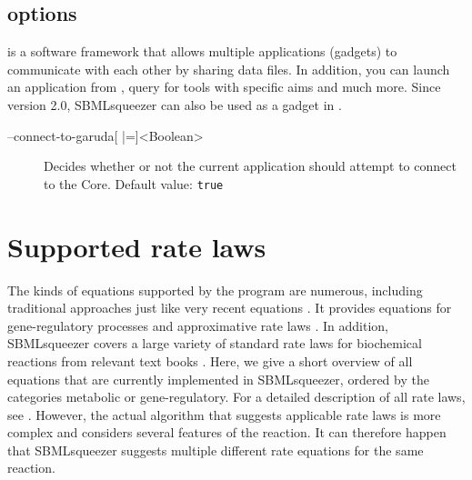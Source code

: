\section{\Garuda options}

\Garuda is a software framework that allows multiple applications (gadgets) to
communicate with each other by sharing data files. In addition, you can launch
an application from \Garuda, query for tools with specific aims and much more.
Since version 2.0, SBMLsqueezer can also be used as a gadget in \Garuda.

\begin{description}
\item[--connect-to-garuda{[} |={]}<Boolean>]
  Decides whether or not the current application should attempt to connect to
  the \Garuda Core. Default value: \texttt{true}
\end{description}
\renewcommand{\descriptionlabel}[1]{\textcolor{black}{\textbf{#1}}}

\chapter{Supported rate laws}\label{chap:RateLaws}

The kinds of equations supported by the program are
numerous, including traditional approaches \citep{Guldberg1879, Michaelis1913}
just like very recent equations \citep{Liebermeister2006, Liebermeister2010}.
It provides equations for gene-regulatory processes
\citep{Hinze2007, Radde2007a, Toepfer2007, Vu2007,Weaver1999} and approximative
rate laws \citep{Savageau1969}.
In addition, SBMLsqueezer covers a large variety of standard rate laws for
biochemical reactions from relevant text books
\citep{Segel1993, Heinrich1996, Bisswanger2000, Cornish-Bowden2004}.
Here, we give a short overview of all equations that are currently implemented
in SBMLsqueezer, ordered by the categories metabolic or gene-regulatory.
For a detailed description of all rate laws, see \citealp{Draeger2011a}.
However, the actual algorithm that suggests applicable rate laws is more complex
and considers several features of the reaction.
It can therefore happen that SBMLsqueezer suggests multiple different rate
equations for the same reaction.

